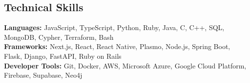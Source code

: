 \documentclass[letterpaper,11pt]{article}
\begin{document}
\begin{justify}
\section{Technical Skills}
 \begin{itemize}[leftmargin=0.15in, label={}]\small{\item{
    \textbf{Languages: }{JavaScript, TypeScript, Python, Ruby, Java, C, C++, SQL, MongoDB, Cypher, Terraform, Bash} \\
    \textbf{Frameworks: }{Next.js, React, React Native, Plasmo, Node.js, Spring Boot, Flask, Django, FastAPI, Ruby on Rails} \\
    \textbf{Developer Tools: }{Git, Docker, AWS, Microsoft Azure, Google Cloud Platform, Firebase, Supabase, Neo4j} \\
  }}
 \end{itemize}


\end{justify}
\end{document}
